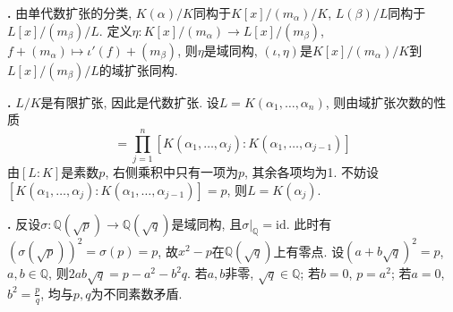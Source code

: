 \par \textbf{\thesolfld .} \cite{GTS} 由单代数扩张的分类, $K(\alpha)/K$同构于$K[x]/(m_\alpha)/K$, $L(\beta)/L$同构于$L[x]/(m_\beta)/L$. 定义$\eta: K[x]/(m_\alpha) \to L[x]/(m_\beta)$, $f+(m_\alpha)\mapsto \iota'(f)+(m_\beta)$, 则$\eta$是域同构, $(\iota, \eta)$是$K[x]/(m_\alpha)/K$到$L[x]/(m_\beta)/L$的域扩张同构. 

\par \textbf{\thesolfld .} $L/K$是有限扩张, 因此是代数扩张. 设$L=K(\alpha_1,\dots,\alpha_n)$, 则由域扩张次数的性质
\begin{equation}
    [L:K] = \prod_{j=1}^n [K(\alpha_1,\dots,\alpha_j):K(\alpha_1,\dots,\alpha_{j-1})]
\end{equation}
由$[L:K]$是素数$p$, 右侧乘积中只有一项为$p$, 其余各项均为1. 不妨设$[K(\alpha_1,\dots,\alpha_j):K(\alpha_1,\dots,\alpha_{j-1})]=p$, 则$L=K(\alpha_j)$. 

\par \textbf{\thesolfld .} 反设$\sigma: \mathbb{Q}(\sqrt{p})\to \mathbb{Q}(\sqrt{q})$是域同构, 且$\sigma|_{\mathbb{Q}} = \mathrm{id}$. 此时有$(\sigma(\sqrt{p}))^2 = \sigma(p)=p$, 故$x^2-p$在$\mathbb{Q}(\sqrt{q})$上有零点. 设$(a+b\sqrt{q})^2=p$, $a,b\in \mathbb{Q}$, 则$2ab\sqrt{q}=p-a^2-b^2q$. 若$a,b$非零, $\sqrt{q}\in \mathbb{Q}$; 若$b=0$, $p=a^2$; 若$a=0$, $b^2=\frac{p}{q}$, 均与$p,q$为不同素数矛盾. 